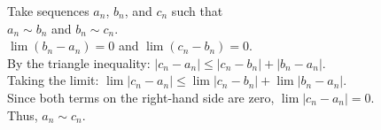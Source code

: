 \documentclass[preview]{standalone}
\begin{document}
\begin{center}
Take sequences $a_n$, $b_n$, and $c_n$ such that\\$a_n \sim b_n$ and $b_n \sim c_n$.\\$\lim (b_n - a_n) = 0$ and $\lim (c_n - b_n) = 0$.\\By the triangle inequality: $|c_n - a_n| \leq |c_n - b_n| + |b_n - a_n|$.\\Taking the limit: $\lim |c_n - a_n| \leq \lim |c_n - b_n| + \lim |b_n - a_n|$.\\Since both terms on the right-hand side are zero, $\lim |c_n - a_n| = 0$.\\Thus, $a_n \sim c_n$.
\end{center}
\end{document}
